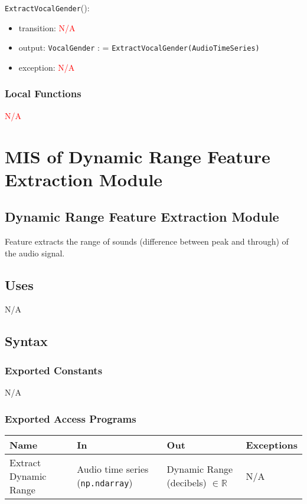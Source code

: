 \documentclass[12pt, titlepage]{article}
\begin{document}
\noindent \texttt{Extract\textunderscore Vocal\textunderscore Gender}():
\begin{itemize}
\item transition: \textcolor{red}{N/A}
\item output: \texttt{VocalGender} : = \texttt{Extract\textunderscore Vocal\textunderscore Gender(Audio\textunderscore Time\textunderscore Series)}
\item exception: \textcolor{red}{N/A}
\end{itemize}

\subsubsection{Local Functions}
\textcolor{red}{N/A}

\section{MIS of Dynamic Range Feature Extraction Module} 

\subsection{Dynamic Range Feature Extraction Module}
Feature extracts the range of sounds (difference between peak and through) of the audio signal.

\subsection{Uses}
N/A

\subsection{Syntax}

\subsubsection{Exported Constants}
N/A

\subsubsection{Exported Access Programs}

\begin{center}
\begin{tabular}{p{2cm} p{4cm} p{4cm} p{2cm}}
\hline
\textbf{Name} & \textbf{In} & \textbf{Out} & \textbf{Exceptions}\\
\hline%
Extract Dynamic Range &Audio time series (\texttt{np.ndarray}) &Dynamic Range (decibels) $\in \mathbb{R}$ &N/A\\
\hline
\end{tabular}
\end{center}
\end{document}
